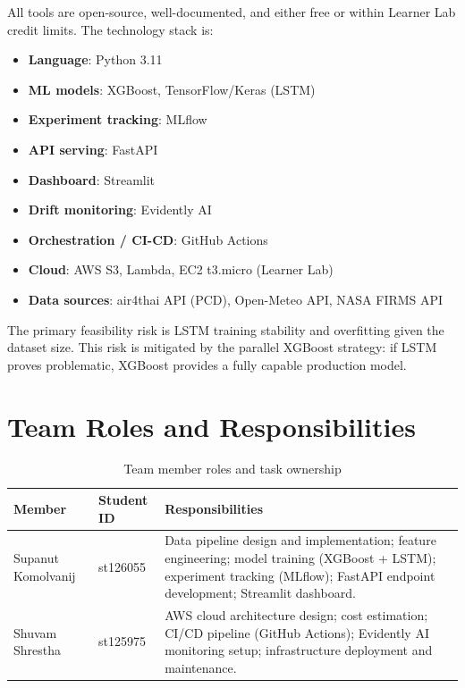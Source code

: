 \documentclass[12pt,a4paper]{report}
\begin{document}
All tools are open-source, well-documented, and either free or within Learner Lab credit limits. The technology stack is:

\begin{itemize}
  \item \textbf{Language}: Python 3.11
  \item \textbf{ML models}: XGBoost, TensorFlow/Keras (LSTM)
  \item \textbf{Experiment tracking}: MLflow
  \item \textbf{API serving}: FastAPI
  \item \textbf{Dashboard}: Streamlit
  \item \textbf{Drift monitoring}: Evidently AI
  \item \textbf{Orchestration / CI-CD}: GitHub Actions
  \item \textbf{Cloud}: AWS S3, Lambda, EC2 t3.micro (Learner Lab)
  \item \textbf{Data sources}: air4thai API (PCD), Open-Meteo API, NASA FIRMS API
\end{itemize}

The primary feasibility risk is LSTM training stability and overfitting given the dataset size. This risk is mitigated by the parallel XGBoost strategy: if LSTM proves problematic, XGBoost provides a fully capable production model.

\section{Team Roles and Responsibilities}

\begin{table}[H]
\centering
\caption{Team member roles and task ownership}
\label{tab:team_roles}
\begin{tabularx}{\textwidth}{@{}llX@{}}
\toprule
\textbf{Member} & \textbf{Student ID} & \textbf{Responsibilities} \\
\midrule
Supanut Komolvanij &
  st126055 &
  Data pipeline design and implementation; feature engineering; model training (XGBoost + LSTM); experiment tracking (MLflow); FastAPI endpoint development; Streamlit dashboard. \\[6pt]
Shuvam Shrestha &
  st125975 &
  AWS cloud architecture design; cost estimation; CI/CD pipeline (GitHub Actions); Evidently AI monitoring setup; infrastructure deployment and maintenance. \\
\bottomrule
\end{tabularx}
\end{table}
\end{document}
